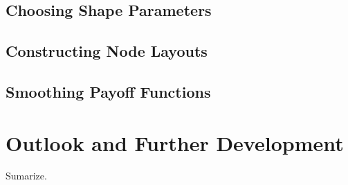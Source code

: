 \documentclass{UUThesisTemplate}
\begin{document}
\section{Choosing Shape Parameters}
\section{Constructing Node Layouts}
\section{Smoothing Payoff Functions}
%
%
\chapter{Outlook and Further Development}
\label{ch:outlook}
Sumarize.

\backmatter
    \nocite{*} %
    
    
\end{document}
